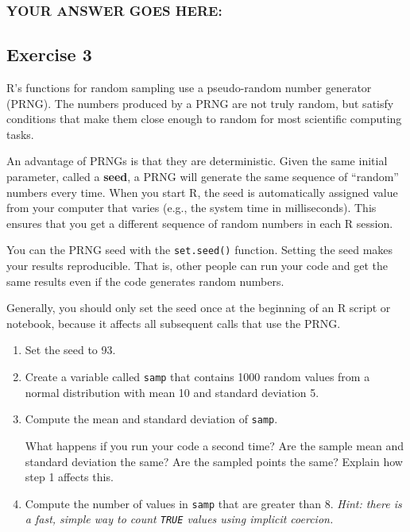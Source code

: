 \documentclass[
]{article}
\begin{document}
\hypertarget{your-answer-goes-here-1}{%
\subsubsection{YOUR ANSWER GOES HERE:}\label{your-answer-goes-here-1}}

\hypertarget{exercise-3}{%
\subsection{Exercise 3}\label{exercise-3}}

R's functions for random sampling use a pseudo-random number generator
(PRNG). The numbers produced by a PRNG are not truly random, but satisfy
conditions that make them close enough to random for most scientific
computing tasks.

An advantage of PRNGs is that they are deterministic. Given the same
initial parameter, called a \textbf{seed}, a PRNG will generate the same
sequence of ``random'' numbers every time. When you start R, the seed is
automatically assigned value from your computer that varies (e.g., the
system time in milliseconds). This ensures that you get a different
sequence of random numbers in each R session.

You can the PRNG seed with the \texttt{set.seed()} function. Setting the
seed makes your results reproducible. That is, other people can run your
code and get the same results even if the code generates random numbers.

Generally, you should only set the seed once at the beginning of an R
script or notebook, because it affects all subsequent calls that use the
PRNG.

\begin{enumerate}
\def\labelenumi{\arabic{enumi}.}
\item
  Set the seed to 93.
\item
  Create a variable called \texttt{samp} that contains 1000 random
  values from a normal distribution with mean 10 and standard deviation
  5.
\item
  Compute the mean and standard deviation of \texttt{samp}.

  What happens if you run your code a second time? Are the sample mean
  and standard deviation the same? Are the sampled points the same?
  Explain how step 1 affects this.
\item
  Compute the number of values in \texttt{samp} that are greater than 8.
  \emph{Hint: there is a fast, simple way to count \texttt{TRUE} values
  using implicit coercion.}
\end{enumerate}
\end{document}
